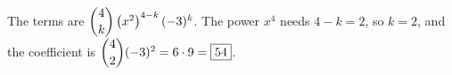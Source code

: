 The terms are $\dbinom4k\left(x^2\right)^{4-k}(-3)^k$. The power $x^4$ needs $4-k=2$, so $k=2$, and the coefficient is $\dbinom42(-3)^2=6\cdot9=\boxed{54}$.
